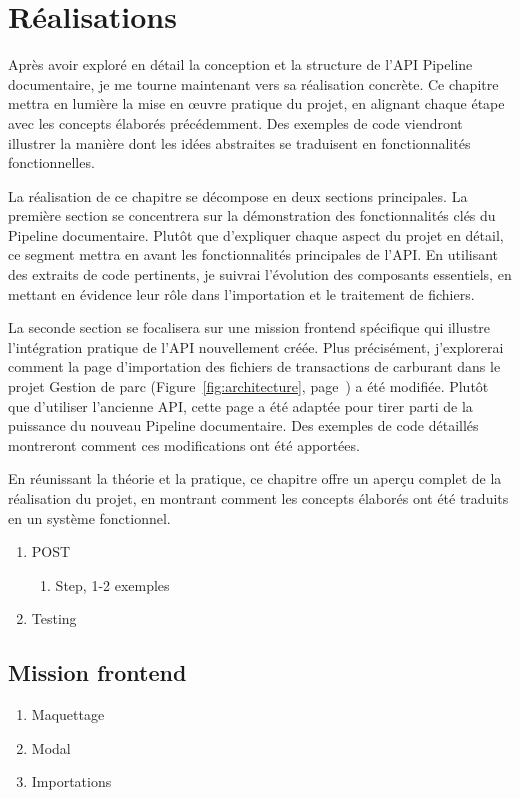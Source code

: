 \chapter{Réalisations}\label{ch:realisations}

Après avoir exploré en détail la conception et la structure de l'API Pipeline documentaire, je me tourne maintenant vers sa réalisation concrète. Ce chapitre mettra en lumière la mise en œuvre pratique du projet, en alignant chaque étape avec les concepts élaborés précédemment. Des exemples de code viendront illustrer la manière dont les idées abstraites se traduisent en fonctionnalités fonctionnelles.

La réalisation de ce chapitre se décompose en deux sections principales. La première section se concentrera sur la démonstration des fonctionnalités clés du Pipeline documentaire. Plutôt que d'expliquer chaque aspect du projet en détail, ce segment mettra en avant les fonctionnalités principales de l'API. En utilisant des extraits de code pertinents, je suivrai l'évolution des composants essentiels, en mettant en évidence leur rôle dans l'importation et le traitement de fichiers.

La seconde section se focalisera sur une mission frontend spécifique qui illustre l'intégration pratique de l'API nouvellement créée. Plus précisément, j'explorerai comment la page d'importation des fichiers de transactions de carburant dans le projet Gestion de parc (Figure~\ref{fig:architecture}, page~\pageref{fig:architecture}) a été modifiée. Plutôt que d'utiliser l'ancienne API, cette page a été adaptée pour tirer parti de la puissance du nouveau Pipeline documentaire. Des exemples de code détaillés montreront comment ces modifications ont été apportées.

En réunissant la théorie et la pratique, ce chapitre offre un aperçu complet de la réalisation du projet, en montrant comment les concepts élaborés ont été traduits en un système fonctionnel.



\begin{enumerate}
    \item POST
          \begin{enumerate}
              \item Step, 1-2 exemples
          \end{enumerate}
    \item Testing
\end{enumerate}

\section{Mission frontend}

\begin{enumerate}
    \item Maquettage
    \item Modal
    \item Importations
\end{enumerate}